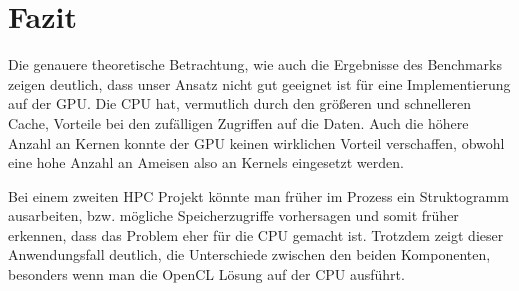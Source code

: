 \section{Fazit}

Die genauere theoretische Betrachtung, wie auch die Ergebnisse des Benchmarks zeigen deutlich, dass unser Ansatz nicht gut geeignet ist für eine Implementierung auf der GPU.
Die CPU hat, vermutlich durch den größeren und schnelleren Cache, Vorteile bei den zufälligen Zugriffen auf die Daten.
Auch die höhere Anzahl an Kernen konnte der GPU keinen wirklichen Vorteil verschaffen, obwohl eine hohe Anzahl an Ameisen also an Kernels eingesetzt werden.

Bei einem zweiten HPC Projekt könnte man früher im Prozess ein Struktogramm ausarbeiten, bzw. mögliche Speicherzugriffe vorhersagen und somit früher erkennen, dass das Problem eher für die CPU gemacht ist.
Trotzdem zeigt dieser Anwendungsfall deutlich, die Unterschiede zwischen den beiden Komponenten, besonders wenn man die OpenCL Lösung auf der CPU ausführt.


